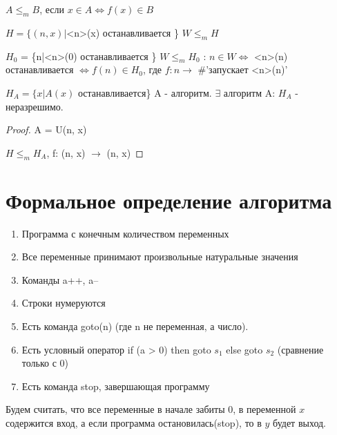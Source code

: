 $A \le_m B$, если $x \in A \Leftrightarrow f(x) \in B$

$H = \{(n, x)|$<n>(x) останавливается \}  $W \le_m H$

$H_0$ = \{n|<n>(0) останавливается \} $W \le_m H_0$ : $n\in W \Leftrightarrow$ <n>(n) останавливается $\Leftrightarrow f(n) \in H_0$, где
$f: n \rightarrow $ \#'запускает <n>(n)'

\begin{assertion}
	$H_A = \{x|A(x)$ останавливается\} A - алгоритм. $\exists$ алгоритм A: $H_A$ - неразрешимо.
\end{assertion}
\begin{proof}
	A = U(n, x) 
	
	$H \le_m H_A$, f: (n, x) $\rightarrow$ (n, x)
\end{proof}

\section{Формальное определение алгоритма}
\begin{enumerate}
	\item Программа с конечным количеством переменных
	\item Все переменные принимают произвольные натуральные значения
	\item Команды a++, a--
	\item Строки нумеруются
	\item Есть команда goto(n) (где n не переменная, а число).
	\item Есть условный оператор if (a > 0) then goto $s_1$ else goto $s_2$ (сравнение только с 0)
	\item Есть команда stop, завершающая программу
\end{enumerate}

Будем считать, что все переменные в начале забиты 0, в переменной $x$ содержится вход, а если программа остановилась(stop), то
в $y$ будет выход.

